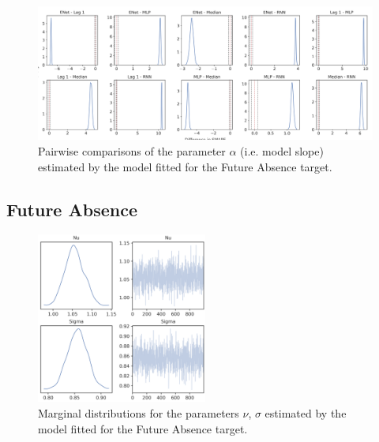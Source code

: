 \begin{figure}[ht]
\centering
\includegraphics[width=\textwidth]{images/appendix_C/collapsed_comp_2.png}
\caption[\textbf{Targets collapsed pairwise comparisons of model fixed effect}]{Pairwise comparisons of the parameter $\alpha$ (i.e. model slope) estimated by the model fitted for the Future Absence target.}
\label{comp_coll_2}
\end{figure}
\FloatBarrier

\subsection{Future Absence}
\label{future_abs_bayes_2}

\begin{figure}[ht]
\centering
\includegraphics[width=0.5\textwidth]{images/appendix_C/Future Absence_marginals_2.png}
\caption[\textbf{Future absence marginal distributions}]{Marginal distributions for the parameters $\nu$, $\sigma$ estimated by the model fitted for the Future Absence target.}
\label{marginals_abs_2}
\end{figure}
\FloatBarrier


